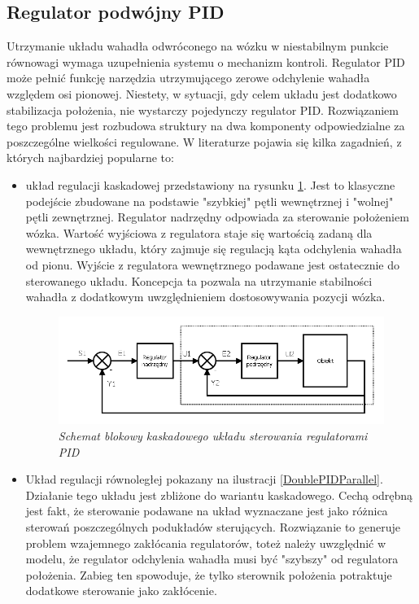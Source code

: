 \documentclass[12pt, oneside]{report}
\theoremstyle{definition}
\begin{document}
\subsection{Regulator podwójny PID}
Utrzymanie układu wahadła odwróconego na wózku w niestabilnym punkcie równowagi wymaga uzupełnienia systemu o mechanizm kontroli. Regulator PID może pełnić funkcję narzędzia utrzymującego zerowe odchylenie wahadła względem osi pionowej. Niestety, w sytuacji, gdy celem układu jest dodatkowo stabilizacja położenia, nie wystarczy pojedynczy regulator PID. Rozwiązaniem tego problemu jest rozbudowa struktury na dwa komponenty odpowiedzialne za poszczególne wielkości regulowane. W literaturze pojawia się kilka zagadnień, z których najbardziej popularne to:
\begin{itemize}
\item układ regulacji kaskadowej przedstawiony na rysunku \ref{DoublePIDCascade}. Jest to klasyczne podejście zbudowane na podstawie "szybkiej" pętli wewnętrznej i "wolnej" pętli zewnętrznej. Regulator nadrzędny odpowiada za sterowanie położeniem wózka. Wartość wyjściowa z regulatora staje się wartością zadaną dla wewnętrznego układu, który zajmuje się regulacją kąta odchylenia wahadła od pionu. Wyjście z regulatora wewnętrznego podawane jest ostatecznie do sterowanego układu. Koncepcja ta pozwala na utrzymanie stabilności wahadła z dodatkowym uwzględnieniem dostosowywania pozycji wózka.
\begin{figure}[H]
	\centering
		\includegraphics[width = 300pt]{DoublePIDCascade} 
		\caption{\textit{Schemat blokowy kaskadowego układu sterowania regulatorami PID\cite{LMIP}}}
		\label{DoublePIDCascade}
\end{figure}
\item Układ regulacji równoległej pokazany na ilustracji \ref{DoublePIDParallel}. Działanie tego układu jest zbliżone do wariantu kaskadowego. Cechą odrębną jest fakt, że sterowanie podawane na układ wyznaczane jest jako różnica sterowań poszczególnych podukładów sterujących. Rozwiązanie to generuje problem wzajemnego zakłócania regulatorów, toteż należy uwzględnić w modelu, że regulator odchylenia wahadła musi być "szybszy" od regulatora położenia. Zabieg ten spowoduje, że tylko sterownik położenia potraktuje dodatkowe sterowanie jako zakłócenie.

\end{itemize}
\end{document}
